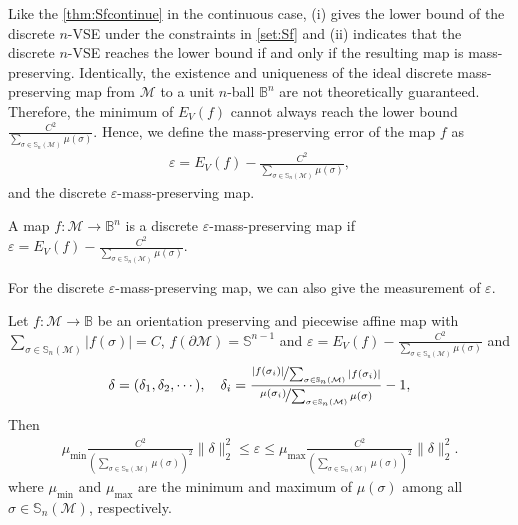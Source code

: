 \documentclass{article}
\begin{document}
Like the \cref{thm:Sfcontinue} in the continuous case, (i) gives the lower bound of the discrete $n$-VSE under the constraints in \eqref{set:Sf} and (ii) indicates that the discrete $n$-VSE reaches the lower bound if and only if the resulting map is mass-preserving. Identically, the existence and uniqueness of the ideal discrete mass-preserving map from $\mathcal{M}$ to a unit $n$-ball $\mathbb{B}^n$ are not theoretically guaranteed. Therefore, the minimum of $E_V(f)$ cannot always reach the lower bound $\frac{C^2}{\sum_{\sigma \in \mathbb{S}_n(\mathcal{M})}\mu(\sigma)}$. Hence, we define the mass-preserving error of the map $f$ as
\begin{align} \label{def:epsilon_discrette}
    \varepsilon = E_V(f) - \frac{C^2}{\sum_{\sigma \in \mathbb{S}_n(\mathcal{M})}\mu(\sigma)},
\end{align}
and the discrete $\varepsilon$-mass-preserving map.
\begin{definition}
    A map $f:\mathcal{M} \to \mathbb{B}^n$ is a discrete $\varepsilon$-mass-preserving map if $\varepsilon = E_V(f) - \frac{C^2}{\sum_{\sigma \in \mathbb{S}_n(\mathcal{M})}\mu(\sigma)}$.
\end{definition}
For the discrete $\varepsilon$-mass-preserving map, we can also give the measurement of $\varepsilon$.

\begin{theorem} \label{thm:epsilon_discrete}
    Let $f:\mathcal{M} \to \mathbb{B}$ be an orientation preserving and piecewise affine map with $\sum_{\sigma\in \mathbb{S}_n(\mathcal{M})} |f(\sigma)| = C$, $f(\partial \mathcal{M}) = \mathbb{S}^{n-1}$ and
    $\varepsilon = E_V(f) - \frac{C^2}{\sum_{\sigma \in \mathbb{S}_n(\mathcal{M})} \mu(\sigma)}$ and
    \begin{align} \label{def:delta}
        \delta = (\delta_1,\delta_2,\cdots), \quad \delta_i = \frac{\nicefrac{|f(\sigma_i)|}{\sum_{\sigma \in \mathbb{S}_n(\mathcal{M})} |f(\sigma_i)|}}{\nicefrac{\mu(\sigma_i)}{\sum_{\sigma \in \mathbb{S}_n(\mathcal{M})} \mu(\sigma)}} - 1,
    \end{align}
    Then
    \begin{align}
        \mu_\text{min} \frac{C^2}{\left( \sum_{\sigma \in \mathbb{S}_n(\mathcal{M})} \mu(\sigma) \right)^2} \|\delta\|_2^2 \leq \varepsilon \leq \mu_\text{max} \frac{C^2}{\left( \sum_{\sigma \in \mathbb{S}_n(\mathcal{M})} \mu(\sigma) \right)^2} \|\delta\|_2^2. \label{ineq:epsilon_discrete}
    \end{align}
    where $\mu_\text{min}$ and $\mu_\text{max}$ are the minimum and maximum of $\mu(\sigma)$ among all $\sigma \in \mathbb{S}_n(\mathcal{M})$, respectively.
\end{theorem}
\end{document}
